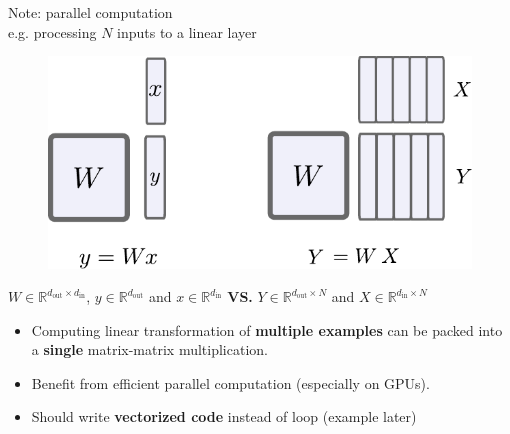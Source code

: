 \begin{frame}{Note: parallel computation\\ e.g. processing $N$ inputs to a linear layer}
\begin{figure}
\centering
\includegraphics[width=0.80\linewidth]{./figures/batch.pdf}
\end{figure}
$W \in \mathbb{R}^{d_\text{out} \times d_\text{in}}$, $y \in \mathbb{R}^{d_\text{out}}$ and $x \in \mathbb{R}^{d_\text{in}}$ \textbf{VS.}  $Y \in \mathbb{R}^{d_\text{out} \times N}$ and $X \in \mathbb{R}^{d_\text{in} \times N}$
\begin{itemize}
\item Computing linear transformation of \textbf{multiple examples} can be packed into a \textbf{single} matrix-matrix multiplication.
\item Benefit from efficient parallel computation (especially on GPUs).
\item Should write \textbf{vectorized code} instead of loop (example later)
\end{itemize}
\end{frame}


